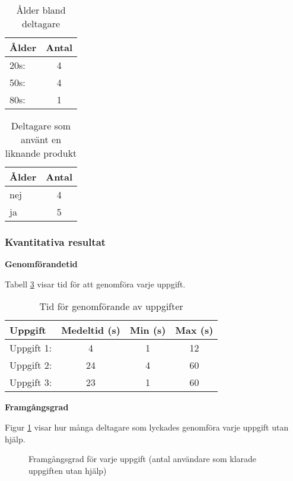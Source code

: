 \begin{table}[H]
\centering
\begin{tabular}{|l|c|}
\hline
\textbf{Ålder} & \textbf{Antal} \\
\hline
20s:  & 4  \\ 
50s:  & 4  \\
80s:  & 1  \\
\hline
\end{tabular}
\caption{Ålder bland deltagare}
\label{tab:age1}
\end{table}

\begin{table}[H]
\centering
\begin{tabular}{|l|c|}
\hline
\textbf{Ålder} & \textbf{Antal} \\
\hline
nej  & 4   \\
ja  & 5  \\
\hline
\end{tabular}
\caption{Deltagare som använt en liknande produkt}
\label{tab:exp1}
\end{table}



\subsubsection{Kvantitativa resultat}

\textbf{Genomförandetid}

Tabell \ref{tab:tid2} visar tid för att genomföra varje uppgift.

\begin{table}[h]
\centering
\begin{tabular}{|l|c|c|c|}
\hline
\textbf{Uppgift} & \textbf{Medeltid (s)} & \textbf{Min (s)} & \textbf{Max (s)} \\
\hline
Uppgift 1:  & 4 & 1 & 12 \\
Uppgift 2:  & 24 & 4 & 60\\
Uppgift 3:  & 23 & 1 & 60\\
\hline
\end{tabular}
\caption{Tid för genomförande av uppgifter}
\label{tab:tid2}
\end{table}

\textbf{Framgångsgrad}

Figur \ref{fig:success_rate} visar hur många deltagare som lyckades genomföra varje uppgift utan hjälp.

\begin{figure}[ht]
    \centering
    \caption{Framgångsgrad för varje uppgift (antal användare som klarade uppgiften utan hjälp)}
    \label{fig:success_rate}
\end{figure}

